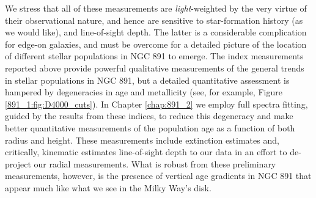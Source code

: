 
We stress that all of these measurements are {\it light}-weighted by
the very virtue of their observational nature, and hence are sensitive
to star-formation history (as we would like), and line-of-sight
depth. The latter is a considerable complication for edge-on galaxies,
and must be overcome for a detailed picture of the location of
different stellar populations in NGC 891 to emerge. The index
measurements reported above provide powerful qualitative measurements
of the general trends in stellar populations in NGC 891, but a
detailed quantitative assessment is hampered by degeneracies in age
and metallicity (see, for example, Figure \ref{891_1:fig:D4000_cuts}).
In Chapter \ref{chap:891_2} we employ full spectra fitting, guided by
the results from these indices, to reduce this degeneracy and make
better quantitative measurements of the population age as a function
of both radius and height. These measurements include extinction
estimates and, critically, kinematic estimates line-of-sight depth to
our data in an effort to de-project our radial measurements. What is
robust from these preliminary measurements, however, is the presence
of vertical age gradients in NGC 891 that appear much like what we see
in the Milky Way's disk.


